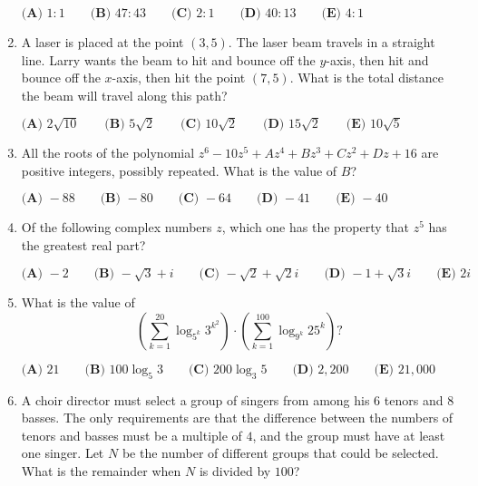 \documentclass{article}
\begin{document}
\begin{enumerate}[label=\arabic*., itemsep=0.5em]
$\textbf{(A) }1:1 \qquad \textbf{(B) }47:43 \qquad \textbf{(C) }2:1 \qquad \textbf{(D) }40:13 \qquad \textbf{(E) }4:1$\par \vspace{0.5em}\item A laser is placed at the point $(3,5)$. The laser beam travels in a straight line. Larry wants the beam to hit and bounce off the $y$-axis, then hit and bounce off the $x$-axis, then hit the point $(7,5)$. What is the total distance the beam will travel along this path?

$\textbf{(A) }2\sqrt{10} \qquad \textbf{(B) }5\sqrt2 \qquad \textbf{(C) }10\sqrt2 \qquad \textbf{(D) }15\sqrt2 \qquad \textbf{(E) }10\sqrt5$\par \vspace{0.5em}\item All the roots of the polynomial $z^6-10z^5+Az^4+Bz^3+Cz^2+Dz+16$ are positive integers, possibly repeated. What is the value of $B$?

$\textbf{(A) }{-}88 \qquad \textbf{(B) }{-}80 \qquad \textbf{(C) }{-}64 \qquad \textbf{(D) }{-}41\qquad \textbf{(E) }{-}40$\par \vspace{0.5em}\item Of the following complex numbers $z$, which one has the property that $z^5$ has the greatest real part?

$\textbf{(A) }{-}2 \qquad \textbf{(B) }{-}\sqrt3+i \qquad \textbf{(C) }{-}\sqrt2+\sqrt2 i \qquad \textbf{(D) }{-}1+\sqrt3 i\qquad \textbf{(E) }2i$\par \vspace{0.5em}\item What is the value of
\begin{equation*}
\left(\sum_{k=1}^{20} \log_{5^k} 3^{k^2}\right)\cdot\left(\sum_{k=1}^{100} \log_{9^k} 25^k\right)?
\end{equation*}

$\textbf{(A) }21 \qquad \textbf{(B) }100\log_5 3 \qquad \textbf{(C) }200\log_3 5 \qquad \textbf{(D) }2{,}200\qquad \textbf{(E) }21{,}000$\par \vspace{0.5em}\item A choir director must select a group of singers from among his $6$ tenors and $8$ basses. The only
requirements are that the difference between the numbers of tenors and basses must be a multiple
of $4$, and the group must have at least one singer. Let $N$ be the number of different groups that could be
selected. What is the remainder when $N$ is divided by $100$?


\end{enumerate}
\end{document}
